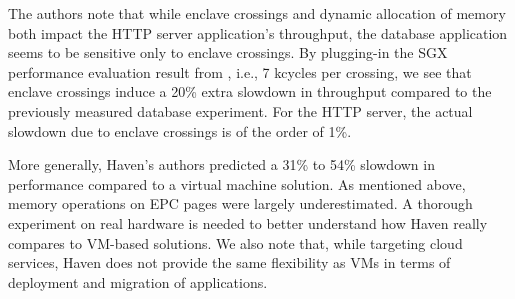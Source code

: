 The authors note that while enclave crossings and dynamic allocation of memory both impact the HTTP server application's throughput, the database application seems to be sensitive only to enclave crossings.
By plugging-in the SGX performance evaluation result from \cite{DBLP:conf/IEEEwisa/ZhaoSTZX16}, i.e., 7 kcycles per crossing, we see that enclave crossings induce a 20\% extra slowdown in throughput compared to the previously measured database experiment.
For the HTTP server, the actual slowdown due to enclave crossings is of the order of 1\%.

More generally, Haven's authors predicted a 31\% to 54\% slowdown in performance compared to a virtual machine solution.
As mentioned above, memory operations on EPC pages were largely underestimated.
A thorough experiment on real hardware is needed to better understand how Haven really compares to VM-based solutions.
We also note that, while targeting cloud services, Haven does not provide the same flexibility as VMs in terms of deployment and migration of applications.
